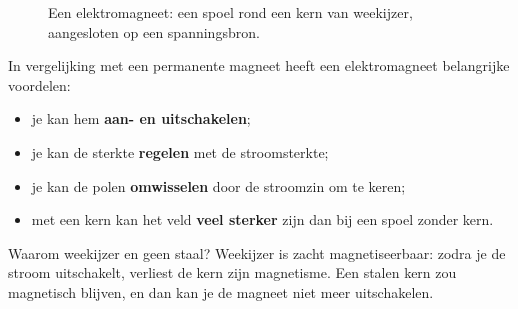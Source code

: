 \documentclass{ximera}
\begin{document}
\begin{figure}[ht!]
    \captionsetup{width=0.85\textwidth}
    \begin{center}
    \end{center}
    \caption{Een elektromagneet: een spoel rond een kern van weekijzer, aangesloten op een spanningsbron.}
    \label{fig:elektromagneet}
\end{figure}

\begin{proposition}[foldable=true,title={Voordelen van een elektromagneet}]\nl
    In vergelijking met een permanente magneet heeft een elektromagneet belangrijke voordelen:
    \begin{itemize}
        \item je kan hem \textbf{aan- en uitschakelen};
        \item je kan de sterkte \textbf{regelen} met de stroomsterkte;
        \item je kan de polen \textbf{omwisselen} door de stroomzin om te keren;
        \item met een kern kan het veld \textbf{veel sterker} zijn dan bij een spoel zonder kern.
    \end{itemize}
\end{proposition}

Waarom weekijzer en geen staal? Weekijzer is zacht magnetiseerbaar: zodra je de stroom uitschakelt, verliest de kern zijn magnetisme. Een stalen kern zou magnetisch blijven, en dan kan je de magneet niet meer uitschakelen.
\end{document}
